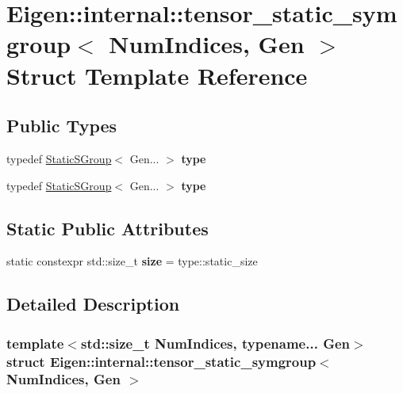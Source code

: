\hypertarget{struct_eigen_1_1internal_1_1tensor__static__symgroup}{}\section{Eigen\+:\+:internal\+:\+:tensor\+\_\+static\+\_\+symgroup$<$ Num\+Indices, Gen $>$ Struct Template Reference}
\label{struct_eigen_1_1internal_1_1tensor__static__symgroup}
\subsection*{Public Types}
\begin{DoxyCompactItemize}
\item 
\mbox{\label{struct_eigen_1_1internal_1_1tensor__static__symgroup_a998b3ba498eb18d6ef0bce86e8f87720}} 
typedef \hyperlink{class_eigen_1_1_static_s_group}{Static\+S\+Group}$<$ Gen... $>$ {\bfseries type}
\item 
\mbox{\label{struct_eigen_1_1internal_1_1tensor__static__symgroup_a998b3ba498eb18d6ef0bce86e8f87720}} 
typedef \hyperlink{class_eigen_1_1_static_s_group}{Static\+S\+Group}$<$ Gen... $>$ {\bfseries type}
\end{DoxyCompactItemize}
\subsection*{Static Public Attributes}
\begin{DoxyCompactItemize}
\item 
\mbox{\label{struct_eigen_1_1internal_1_1tensor__static__symgroup_ac6b0a8d89af4cb3c917d00af7c2e9d44}} 
static constexpr std\+::size\+\_\+t {\bfseries size} = type\+::static\+\_\+size
\end{DoxyCompactItemize}


\subsection{Detailed Description}
\subsubsection*{template$<$std\+::size\+\_\+t Num\+Indices, typename... Gen$>$\newline
struct Eigen\+::internal\+::tensor\+\_\+static\+\_\+symgroup$<$ Num\+Indices, Gen $>$}



